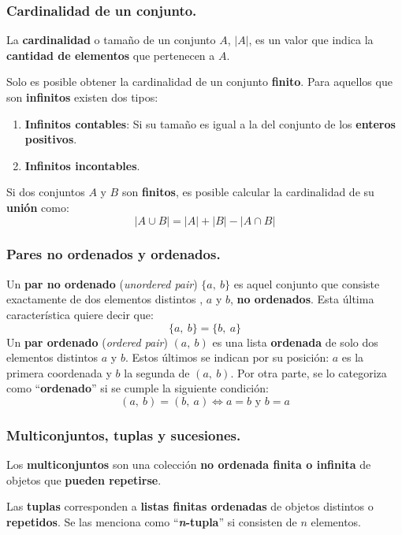 \documentclass[12pt]{article}
\begin{document}
\subsubsection{Cardinalidad de un conjunto.}

La \textbf{cardinalidad} o tamaño de un conjunto $A$, $|A|$, es un valor que indica la \textbf{cantidad de elementos} que pertenecen a $A$.

Solo es posible obtener la cardinalidad de un conjunto \textbf{finito}. Para aquellos que son \textbf{infinitos} existen dos tipos:

\begin{enumerate}
\item \textbf{Infinitos contables}: Si su tamaño es igual a la del conjunto de los \textbf{enteros positivos}.

\item \textbf{Infinitos incontables}.
\end{enumerate}

Si dos conjuntos $A$ y $B$ son \textbf{finitos}, es posible calcular la cardinalidad de su \textbf{unión} como:
\[
  |A \cup B| = |A| + |B| - |A \cap B|
\]

\subsubsection{Pares no ordenados y ordenados.}

Un \textbf{par no ordenado} (\textit{unordered pair}) $\{a, \ b\}$ es aquel conjunto que consiste exactamente de dos elementos distintos , $a$ y $b$, \textbf{no ordenados}. Esta última característica quiere decir que:
\[
  \{a, \ b\} = \{b, \ a\}
\]
Un \textbf{par ordenado} (\textit{ordered pair}) $(a, \ b)$ es una lista \textbf{ordenada} de solo dos elementos distintos $a$ y $b$. Estos últimos se indican por su posición: $a$ es la primera coordenada y $b$ la segunda de $(a, \ b)$. Por otra parte, se lo categoriza como ``\textbf{ordenado}'' si se cumple la siguiente condición:
\[
  (a, \ b) = (b, \ a) \iff a = b \text{ y } b = a
\]

\subsubsection{Multiconjuntos, tuplas y sucesiones.}

Los \textbf{multiconjuntos} son una colección \textbf{no ordenada finita o infinita} de objetos que \textbf{pueden repetirse}.

Las \textbf{tuplas} corresponden a \textbf{listas finitas ordenadas} de objetos distintos o \textbf{repetidos}. Se las menciona como ``\textbf{\textit{n}-tupla}'' si consisten de $n$ elementos.
\end{document}
